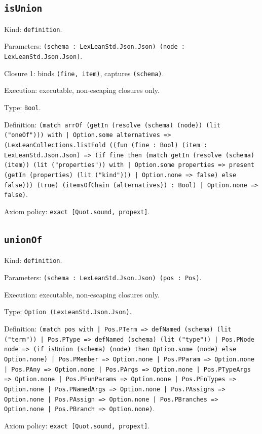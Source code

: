 \documentclass[11pt]{article}
\begin{document}
\subsection*{\texttt{isUnion}}
\noindent Kind: \texttt{definition}.\par
\noindent Parameters: \texttt{(schema : LexLeanStd.Json.Json) (node : LexLeanStd.Json.Json)}.\par
\noindent Closure 1: binds \texttt{(fine, item)}, captures \texttt{(schema)}.\par
\noindent Execution: executable, non-escaping closures only.\par
\noindent Type: \texttt{Bool}.\par
\noindent Definition: \texttt{(match arrOf (getIn (resolve (schema) (node)) (lit ("oneOf"))) with | Option.some alternatives => (LexLeanCollections.listFold ((fun (fine : Bool) (item : LexLeanStd.Json.Json) => (if fine then (match getIn (resolve (schema) (item)) (lit ("properties")) with | Option.some properties => present (getIn (properties) (lit ("kind"))) | Option.none => false) else false))) (true) (itemsOfChain (alternatives)) : Bool) | Option.none => false)}.\par
\noindent Axiom policy: \texttt{exact [Quot.sound, propext]}.\par
\subsection*{\texttt{unionOf}}
\noindent Kind: \texttt{definition}.\par
\noindent Parameters: \texttt{(schema : LexLeanStd.Json.Json) (pos : Pos)}.\par
\noindent Execution: executable, non-escaping closures only.\par
\noindent Type: \texttt{Option (LexLeanStd.Json.Json)}.\par
\noindent Definition: \texttt{(match pos with | Pos.PTerm => defNamed (schema) (lit ("term")) | Pos.PType => defNamed (schema) (lit ("type")) | Pos.PNode node => (if isUnion (schema) (node) then Option.some (node) else Option.none) | Pos.PMember => Option.none | Pos.PParam => Option.none | Pos.PAny => Option.none | Pos.PArgs => Option.none | Pos.PTypeArgs => Option.none | Pos.PFunParams => Option.none | Pos.PFnTypes => Option.none | Pos.PNamedArgs => Option.none | Pos.PAssigns => Option.none | Pos.PAssign => Option.none | Pos.PBranches => Option.none | Pos.PBranch => Option.none)}.\par
\noindent Axiom policy: \texttt{exact [Quot.sound, propext]}.\par
\end{document}
